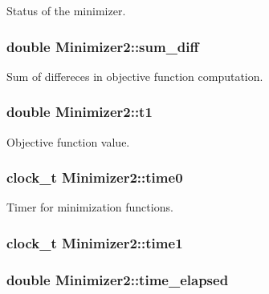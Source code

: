 Status of the minimizer. 

\hypertarget{classMinimizer2_a2a073ef1806f84be7c4f4b8cf6f7f2a7}{
\subsubsection[{sum\_\-diff}]{\setlength{\rightskip}{0pt plus 5cm}double {\bf Minimizer2::sum\_\-diff}}}
\label{classMinimizer2_a2a073ef1806f84be7c4f4b8cf6f7f2a7}


Sum of differeces in objective function computation. 

\hypertarget{classMinimizer2_afefc05f3f81b5f002041933d12352642}{
\subsubsection[{t1}]{\setlength{\rightskip}{0pt plus 5cm}double {\bf Minimizer2::t1}}}
\label{classMinimizer2_afefc05f3f81b5f002041933d12352642}


Objective function value. 

\hypertarget{classMinimizer2_ac63693b02b0d74534c318db59499891b}{
\subsubsection[{time0}]{\setlength{\rightskip}{0pt plus 5cm}clock\_\-t {\bf Minimizer2::time0}}}
\label{classMinimizer2_ac63693b02b0d74534c318db59499891b}


Timer for minimization functions. 

\hypertarget{classMinimizer2_abb0118980a0aa4c6717ff9dc88668f45}{
\subsubsection[{time1}]{\setlength{\rightskip}{0pt plus 5cm}clock\_\-t {\bf Minimizer2::time1}}}
\label{classMinimizer2_abb0118980a0aa4c6717ff9dc88668f45}
\hypertarget{classMinimizer2_a2fefd1c40811da6a30fed3c273e624d7}{
\subsubsection[{time\_\-elapsed}]{\setlength{\rightskip}{0pt plus 5cm}double {\bf Minimizer2::time\_\-elapsed}}}
\label{classMinimizer2_a2fefd1c40811da6a30fed3c273e624d7}


